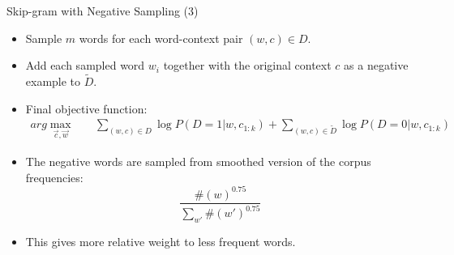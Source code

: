 \begin{frame}{Skip-gram with Negative Sampling (3)}
\begin{scriptsize}
\begin{itemize}

\item Sample $m$ words for each word-context pair  $(w,c) \in D$.
\item Add each sampled word $w_i$ together with the original context $c$ as a negative example to $\tilde{D}$.



\item Final objective function:
\begin{equation}
\begin{split}
arg \max_{\vec{c}, \vec{w}} & \quad \sum_{(w,c) \in D}{\log P(D = 1| w,c_{1:k})} + \sum_{(w,c) \in \tilde{D}} \log P(D = 0| w,c_{1:k})
\end{split}
\end{equation}

\item The negative words are sampled from smoothed version of the corpus frequencies:
\begin{displaymath}
\frac{\#(w)^{0.75}}{\sum_{w'}\#(w')^{0.75}}
\end{displaymath}

\item This gives more relative weight to less frequent words.

\end{itemize}
\end{scriptsize}
\end{frame}






